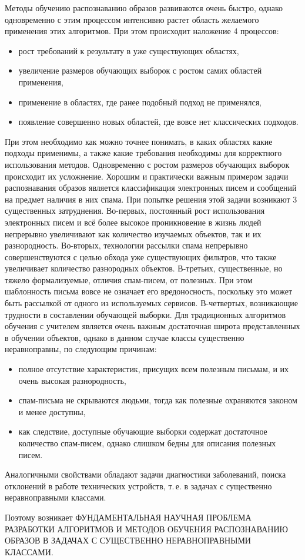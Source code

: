 \documentclass[12pt]{article}
\begin{document}
	Методы обучению распознаванию образов развиваются очень быстро, однако одновременно с этим процессом интенсивно растет область желаемого применения этих алгоритмов. 
	При этом происходит наложение 4 процессов:
	\begin{itemize}
		\item рост требований к результату в уже существующих областях,
		\item увеличение размеров обучающих выборок с ростом самих областей применения,
		\item применение в областях, где ранее подобный подход не применялся,
		\item появление совершенно новых областей, где вовсе нет классических подходов.
	\end{itemize}
	При этом необходимо как можно точнее понимать, в каких областях какие подходы применимы, а также какие требования необходимы для корректного использования методов.
	Одновременно с ростом размеров обучающих выборок происходит их усложнение. 
	Хорошим и практически важным примером задачи распознавания образов является классификация электронных писем и сообщений на предмет наличия в них спама. 
	При попытке решения этой задачи возникают 3 существенных затруднения. 
	Во-первых, постоянный рост использования электронных писем и всё более высокое проникновение в жизнь людей непрерывно увеличивают как количество изучаемых объектов, так и их разнородность.
	Во-вторых, технологии рассылки спама непрерывно совершенствуются с целью обхода уже существующих фильтров, что также увеличивает количество разнородных объектов.
	В-третьих, существенные, но тяжело формализуемые, отличия спам-писем, от полезных. 
	При этом шаблонность письма вовсе не означает его вредоносность, поскольку это может быть рассылкой от одного из используемых сервисов.
	В-четвертых, возникающие трудности в составлении обучающей выборки. Для традиционных алгоритмов обучения с учителем является очень важным достаточная широта представленных в обучении объектов, однако в данном случае классы существенно неравноправны, по следующим причинам:
	\begin{itemize}
	 	\item полное отсутствие характеристик, присущих всем полезным письмам, и их очень высокая разнородность,
	 	\item спам-письма не скрываются людьми, тогда как полезные охраняются законом и менее доступны,
	 	\item как следствие, доступные обучающие выборки содержат достаточное количество спам-писем, однако слишком бедны для описания полезных писем.
	\end{itemize}

	Аналогичными свойствами обладают задачи диагностики заболеваний, поиска отклонений в работе технических устройств, т.\,е. в задачах с существенно неравноправными классами.

	Поэтому возникает \MakeTextUppercase{фундаментальная научная проблема разработки алгоритмов и методов обучения распознаванию образов в задачах с существенно неравноправными классами.}
\end{document}
